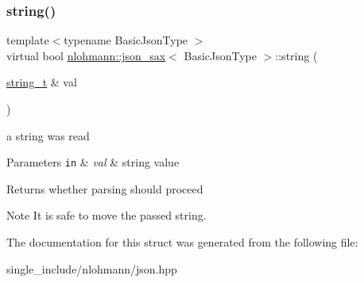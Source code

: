 \subsubsection{\texorpdfstring{string()}{string()}}
{\footnotesize\ttfamily template$<$typename Basic\+Json\+Type $>$ \\
virtual bool \hyperlink{structnlohmann_1_1json__sax}{nlohmann\+::json\+\_\+sax}$<$ Basic\+Json\+Type $>$\+::string (\begin{DoxyParamCaption}\item[{\hyperlink{structnlohmann_1_1json__sax_ae01977a9f3c5b3667b7a2929ed91061e}{string\+\_\+t} \&}]{val }\end{DoxyParamCaption})\hspace{0.3cm}{\ttfamily [pure virtual]}}



a string was read 


\begin{DoxyParams}[1]{Parameters}
\mbox{\tt in}  & {\em val} & string value \\
\hline
\end{DoxyParams}
\begin{DoxyReturn}{Returns}
whether parsing should proceed 
\end{DoxyReturn}
\begin{DoxyNote}{Note}
It is safe to move the passed string. 
\end{DoxyNote}


The documentation for this struct was generated from the following file\+:\begin{DoxyCompactItemize}
\item 
single\+\_\+include/nlohmann/json.\+hpp\end{DoxyCompactItemize}
